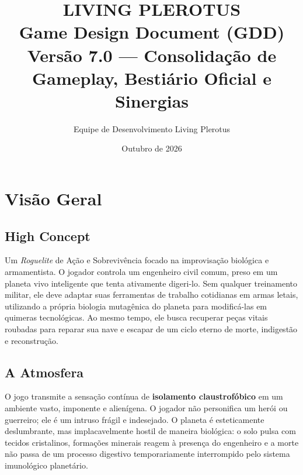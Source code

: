 \documentclass[a4paper,12pt]{report}
\title{\textbf{LIVING PLEROTUS}\\ \large Game Design Document (GDD)\\ \small Versão 7.0 --- Consolidação de Gameplay, Bestiário Oficial e Sinergias}
\author{Equipe de Desenvolvimento Living Plerotus}
\date{Outubro de 2026}
\begin{document}
\maketitle
\tableofcontents

\chapter{Visão Geral}

\section{High Concept}
Um \textit{Roguelite} de Ação e Sobrevivência focado na improvisação biológica e armamentista. O jogador controla um engenheiro civil comum, preso em um planeta vivo inteligente que tenta ativamente digeri-lo. Sem qualquer treinamento militar, ele deve adaptar suas ferramentas de trabalho cotidianas em armas letais, utilizando a própria biologia mutagênica do planeta para modificá-las em quimeras tecnológicas. Ao mesmo tempo, ele busca recuperar peças vitais roubadas para reparar sua nave e escapar de um ciclo eterno de morte, indigestão e reconstrução.

\section{A Atmosfera}
O jogo transmite a sensação contínua de \textbf{isolamento claustrofóbico} em um ambiente vasto, imponente e alienígena. O jogador não personifica um herói ou guerreiro; ele é um intruso frágil e indesejado. O planeta é esteticamente deslumbrante, mas implacavelmente hostil de maneira biológica: o solo pulsa com tecidos cristalinos, formações minerais reagem à presença do engenheiro e a morte não passa de um processo digestivo temporariamente interrompido pelo sistema imunológico planetário.
\end{document}
